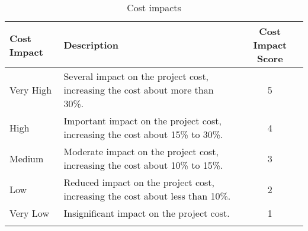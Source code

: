 \begin{longtable}[H]{l >{\raggedright\arraybackslash}p{7.8cm} c}
	
	\toprule[2pt]
	
	\textbf{Cost Impact} &  \textbf{Description}  & \textbf{Cost Impact Score} \\
	
	\midrule [1.5pt]
	\endhead
	
	Very High & Several impact on the project cost, increasing the cost about more than 30\%. & 5
	\vspace{0.2cm} \\
	
	\midrule
	
	High & Important impact on the project cost, increasing the cost about 15\% to 30\%. & 4
	\vspace{0.2cm} \\
	
	\midrule
	
	Medium & Moderate impact on the project cost, increasing the cost about 10\% to 15\%. & 3
	\vspace{0.2cm} \\

	\midrule

	Low & Reduced impact on the project cost, increasing the cost about  less than 10\%. & 2
	\vspace{0.2cm} \\

	\midrule

	Very Low & Insignificant impact on the project cost. & 1
	\vspace{0.2cm} \\
		
	\bottomrule[2pt]
	
	\caption{Cost impacts}

\end{longtable}